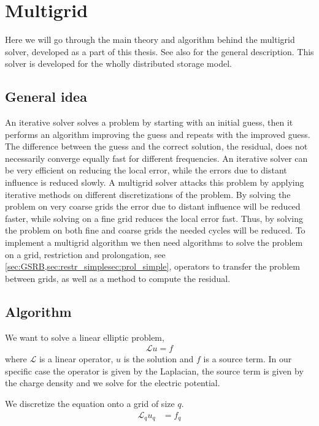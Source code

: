 
\section{Multigrid}
	\label{sec:multigrid}
	Here we will go through the main theory and
	algorithm behind the multigrid solver, developed as a part of this thesis.
	See also \citet{press_numerical_1988,trottenberg_multigrid_2000} for the general description.
	This solver is developed for the wholly distributed storage model.

	\subsection{General idea}
		\label{sec:mg_impl}
		An iterative solver solves a problem by starting with an initial guess, then it performs an algorithm
		improving the guess and repeats with the improved guess. The difference between
		the guess and the correct solution, the residual, does not necessarily converge equally fast for different frequencies.
		An iterative solver can be very efficient on reducing the local error,
		while the errors due to distant influence is reduced slowly.
		A multigrid solver attacks this problem by applying iterative methods on different discretizations of the problem. By solving the problem on very coarse grids
		the error due to distant influence will be reduced faster, while solving on a fine grid reduces the local error fast. Thus, by solving the problem on both
		fine and coarse grids the needed cycles will be reduced. To implement a multigrid algorithm we then need algorithms to solve the problem on a grid,
		restriction and prolongation, see \cref{sec:GSRB,sec:restr_simplesec:prol_simple}, operators to transfer the problem between grids, as well as a method to compute the residual.


	\subsection{Algorithm}
	\label{sec:algorithm}
	We want to solve a linear elliptic problem,
		\begin{align}
			\mathcal{L} u = f
		\end{align}
	where \(\mathcal{L}\) is a linear operator, \(u\) is the solution and \(f\) is
	a source term. In our specific case the operator is given by the Laplacian, the
	source term is given by the charge density and we solve for the electric potential.

	We discretize the equation onto a grid of size \(q\).
	\begin{align}
		\mathcal{L}_q u_q &= f_q \label{eq:difference}
	\end{align}

